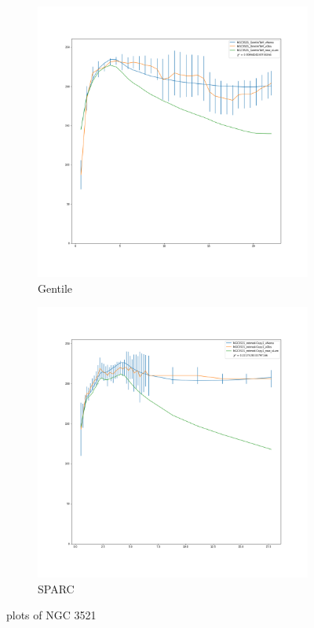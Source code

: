 \documentclass[reprint,%
 amsmath,amssymb,
 aps,
]{revtex4-1}
\begin{document}
%
%
%
%  
  \begin{figure}[h]
\begin{subfigure}{.5\textwidth}
  \centering
  \includegraphics[width=.8\linewidth]{NGC3521_GentileTaM_XueSofue.png}
  \caption{Gentile\cite{Gent}}
  \label{fig:sfig19}
\end{subfigure}%
\begin{subfigure}{.5\textwidth}
  \centering
  \includegraphics[width=.8\linewidth]{NGC3521_rotmod-Copy1_XueSofue.png}
  \caption{SPARC\cite{2016Lelli}}
  \label{fig:sfig20}
\end{subfigure}
\caption{plots of NGC 3521}
\label{fig:fig3521}
\end{figure}
\end{document}

